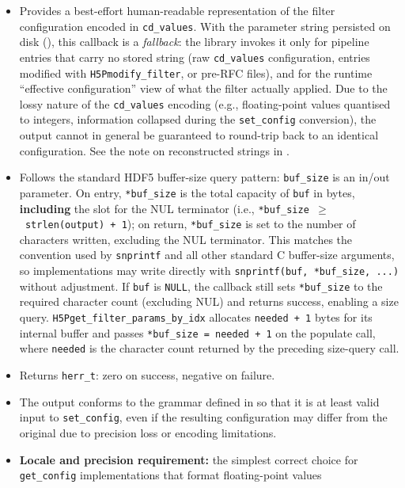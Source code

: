 \documentclass[../RFC-HDFG-2026-001.tex]{subfiles}
\begin{document}
\begin{itemize}
\item Provides a best-effort human-readable representation of the filter
  configuration encoded in \texttt{cd\_values}.  With the parameter string
  persisted on disk (), this callback is a
  \emph{fallback}: the library invokes it only for pipeline entries that
  carry no stored string (raw \texttt{cd\_values} configuration, entries
  modified with \texttt{H5Pmodify\_filter}, or pre-RFC files), and for the runtime
  ``effective configuration'' view of what the filter actually applied.
  Due to the lossy nature of the
  \texttt{cd\_values} encoding (e.g., floating-point values quantised to integers,
  information collapsed during the \texttt{set\_config} conversion), the output
  cannot in general be guaranteed to round-trip back to an identical
  configuration.  See the note on reconstructed strings in
  .
\item Follows the standard HDF5 buffer-size query pattern: \texttt{buf\_size} is
  an in/out parameter. On entry, \texttt{*buf\_size} is the total capacity of
  \texttt{buf} in bytes, \textbf{including} the slot for the NUL terminator
  (i.e., \texttt{*buf\_size~$\geq$~strlen(output)~+~1}); on return,
  \texttt{*buf\_size} is set to the number of characters written, excluding the
  NUL terminator.  This matches the convention used by \texttt{snprintf} and all
  other standard C buffer-size arguments, so implementations may write directly
  with \texttt{snprintf(buf,~*buf\_size,~...)} without adjustment.  If
  \texttt{buf} is \texttt{NULL}, the callback still sets \texttt{*buf\_size} to
  the required character count (excluding NUL) and returns success, enabling a
  size query.  \texttt{H5Pget\_filter\_params\_by\_idx} allocates
  \texttt{needed~+~1} bytes for its internal buffer and passes
  \texttt{*buf\_size~=~needed~+~1} on the populate call, where \texttt{needed}
  is the character count returned by the preceding size-query call.
\item Returns \texttt{herr\_t}: zero on success, negative on failure.
\item The output conforms to the grammar defined in
   so that it is at least valid input to
  \texttt{set\_config}, even if the resulting configuration may differ from the
  original due to precision loss or encoding limitations.
\item \textbf{Locale and precision requirement:} the simplest correct choice
  for \texttt{get\_config} implementations that format floating-point values

\end{itemize}
\end{document}
